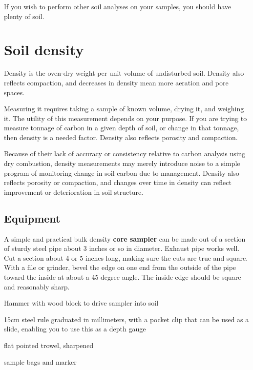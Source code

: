 \documentclass[11pt,letterpaper,twoside,onecolumn]{memoir}
\begin{document}
If you wish to perform other soil analyses on your samples, you should have plenty of soil.  

\chapter{Soil density}

Density is the oven-dry weight per unit volume of undisturbed soil. Density also reflects compaction, and decreases in density mean more aeration and pore spaces.

Measuring it requires taking a sample of known volume, drying it, and weighing it. The utility of this measurement depends on your purpose. If you are trying to measure tonnage of carbon in a given depth of soil, or change in that tonnage, then density is a needed factor. Density also reflects porosity and compaction.

Because of their lack of accuracy or consistency relative to carbon analysis using dry combustion, density measurements may merely introduce noise to a simple program of monitoring change in soil carbon due to management. Density also reflects porosity or compaction, and changes over time in density can reflect improvement or deterioration in soil structure.

\section*{Equipment}

\begin{checkboxlist}

\item A simple and practical bulk density \textbf{core sampler} can be made out of a section of sturdy steel pipe about 3 inches or so in diameter. Exhaust pipe works well. Cut a section about 4 or 5 inches long, making sure the cuts are true and square. With a file or grinder, bevel the edge on one end from the outside of the pipe toward the inside at about a 45-degree angle. The inside edge should be square and reasonably sharp.

\item Hammer with wood block to drive sampler into soil
\item 15cm steel rule graduated in millimeters, with a pocket clip that can be used as a slide, enabling you to use this as a depth gauge
\item flat pointed trowel, sharpened
\item sample bags and marker

\end{checkboxlist}
\end{document}
